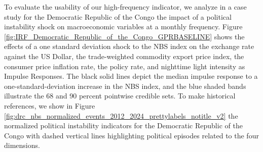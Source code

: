 \documentclass[12pt,a4paper,fleqn]{article}
\begin{document}




To evaluate the usability of our high-frequency indicator, we analyze in a case study for the Democratic Republic of the Congo the impact of a political instability shock on macroeconomic variables at a monthly frequency. Figure \ref{fig:IRF_Democratic_Republic_of_the_Congo_GPRBASELINE} shows the effects of a one standard deviation shock to the NBS index on the exchange rate against the US Dollar, the trade-weighted commodity export price index, the consumer price inflation rate, the policy rate, and nighttime light intensity as Impulse Responses. The black solid lines depict the median impulse response to a one-standard-deviation increase in the NBS index, and the blue shaded bands illustrate the 68 and 90 percent pointwise credible sets. To make historical references, we show in Figure \ref{fig:drc_nbs_normalized_events_2012_2024_prettylabels_notitle_v2} the normalized political instability indicators for the Democratic Republic of the Congo with dashed vertical lines highlighting political episodes related to the four dimensions.
\end{document}
